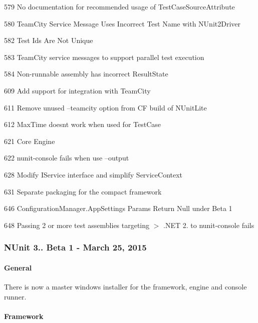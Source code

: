 \begin{DoxyItemize}
\item 579 No documentation for recommended usage of Test\+Case\+Source\+Attribute
\item 580 Team\+City Service Message Uses Incorrect Test Name with N\+Unit2\+Driver
\item 582 Test Ids Are Not Unique
\item 583 Team\+City service messages to support parallel test execution
\item 584 Non-\/runnable assembly has incorrect Result\+State
\item 609 Add support for integration with Team\+City
\item 611 Remove unused --teamcity option from CF build of N\+Unit\+Lite
\item 612 Max\+Time doesn\textquotesingle{}t work when used for Test\+Case
\item 621 Core Engine
\item 622 nunit-\/console fails when use --output
\item 628 Modify I\+Service interface and simplify Service\+Context
\item 631 Separate packaging for the compact framework
\item 646 Configuration\+Manager.\+App\+Settings Params Return Null under Beta 1
\item 648 Passing 2 or more test assemblies targeting $>$ .N\+ET 2. to nunit-\/console fails
\end{DoxyItemize}

\subsubsection*{N\+Unit 3.. Beta 1 -\/ March 25, 2015}

\paragraph*{General}


\begin{DoxyItemize}
\item There is now a master windows installer for the framework, engine and console runner.
\end{DoxyItemize}

\paragraph*{Framework}


